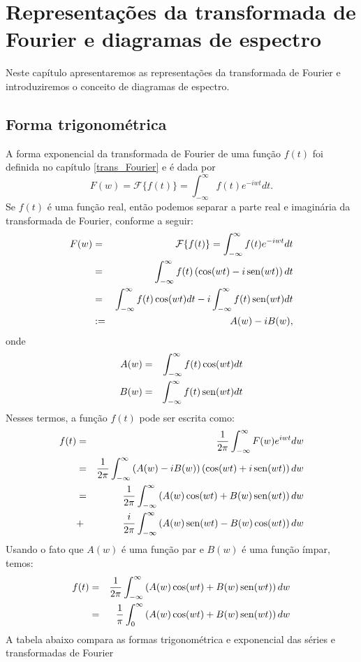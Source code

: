 %
\chapter{Representações da transformada de Fourier e diagramas de espectro}

Neste capítulo apresentaremos as representações da transformada de Fourier e introduziremos o conceito de diagramas de espectro.

\section{Forma trigonométrica}
A forma exponencial da transformada de Fourier de uma função $f(t)$ foi definida no capítulo \ref{trans_Fourier} e é dada por
$$
F(w)=\mathcal{F}\{f(t)\}=\int_{-\infty}^\infty f(t)e^{-iwt}dt.
$$
Se $f(t)$ é uma função real, então podemos separar a parte real e imaginária da transformada de Fourier, conforme a seguir:
\begin{eqnarray*}
F(w)&=&\mathcal{F}\{f(t)\}=\int_{-\infty}^\infty f(t)e^{-iwt}dt\\
&=&\int_{-\infty}^\infty f(t)\left(\cos(wt)-i\operatorname{sen}(wt)\right)dt\\
&=&\int_{-\infty}^\infty f(t)\cos(wt)dt-i\int_{-\infty}^\infty f(t)\operatorname{sen}(wt) dt\\
&:=&A(w)-iB(w),
\end{eqnarray*}
onde
\begin{eqnarray*}
A(w)&=&\int_{-\infty}^\infty f(t)\cos(wt)dt\\
B(w)&=&\int_{-\infty}^\infty f(t)\operatorname{sen}(wt) dt
\end{eqnarray*}
Nesses termos, a função $f(t)$ pode ser escrita como:
\begin{eqnarray*}
f(t)&=&\frac{1}{2\pi}\int_{-\infty}^\infty F(w)e^{iwt}dw\\
&=&\frac{1}{2\pi}\int_{-\infty}^\infty \left(A(w)-i B(w)\right)\left(\cos(wt)+i\operatorname{sen}(wt)\right)dw\\
&=&\frac{1}{2\pi}\int_{-\infty}^\infty\left( A(w)\cos(wt)+ B(w)\operatorname{sen}(wt)\right)dw\\&+&\frac{i}{2\pi}\int_{-\infty}^\infty \left(A(w)\operatorname{sen}(wt)- B(w)\cos(wt)\right)dw
\end{eqnarray*}
Usando o fato que $A(w)$ é uma função par e $B(w)$ é uma função ímpar, temos:
\begin{eqnarray*}
f(t)&=&\frac{1}{2\pi}\int_{-\infty}^\infty\left(A(w)\cos(wt)+ B(w)\operatorname{sen}(wt)\right)dw\\
&=&\frac{1}{\pi}\int_{0}^\infty\left( A(w)\cos(wt)+ B(w)\operatorname{sen}(wt)\right)dw
\end{eqnarray*}
A tabela abaixo compara as formas trigonométrica e exponencial das séries e transformadas de Fourier

